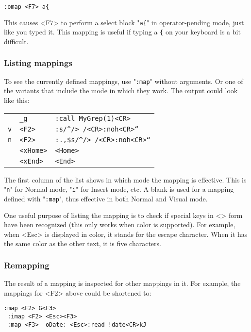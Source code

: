 \begin{Verbatim}[samepage=true]
 :omap <F7> a{
\end{Verbatim}

This causes <F7> to perform a select block "\texttt{a\{}" in operator-pending mode, just like you typed it.
This mapping is useful if typing a \texttt{\{} on your keyboard is a bit difficult.
\subsubsection{Listing mappings}
To see the currently defined mappings, use "\texttt{:map}" without arguments.
Or one of the variants that include the mode in which they work.
The output could look like this:

\begin{center} \begin{tabular}{l l l}
				& \texttt{\_g} & \texttt{:call MyGrep(1)<CR>} \\
				\texttt{v} &  \texttt{<F2>} & \texttt{:s/\string^/> /<CR>:noh<CR>``} \\
				\texttt{n} &  \texttt{<F2>} & \texttt{:.,\$s/\string^/> /<CR>:noh<CR>``} \\
				& \texttt{<xHome>} & \texttt{<Home>} \\
				& \texttt{<xEnd>} & \texttt{<End>} \\
\end{tabular} \end{center}

The first column of the list shows in which mode the mapping is effective.
This is "\texttt{n}" for Normal mode, "\texttt{i}" for Insert mode, etc.
A blank is used for a mapping defined with "\texttt{:map}", thus effective in both Normal and Visual mode.

One useful purpose of listing the mapping is to check if special keys in <> form have been recognized (this only works when color is supported).
For example, when <Esc> is displayed in color, it stands for the escape character.
When it has the same color as the other text, it is five characters.

\subsubsection{Remapping}
The result of a mapping is inspected for other mappings in it.
For example, the mappings for <F2> above could be shortened to:

\begin{Verbatim}[samepage=true]
 :map <F2> G<F3>
 :imap <F2> <Esc><F3>
 :map <F3>  oDate: <Esc>:read !date<CR>kJ
\end{Verbatim}

